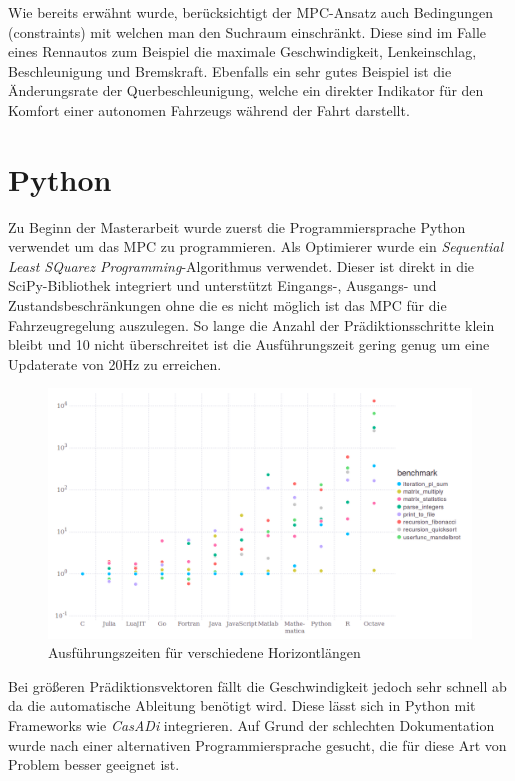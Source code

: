 \documentclass{like}
\begin{document}
Wie bereits erwähnt wurde, berücksichtigt der \ac{MPC}-Ansatz auch  Bedingungen (constraints) mit welchen man den Suchraum einschränkt. Diese sind im Falle eines Rennautos zum Beispiel die maximale Geschwindigkeit, Lenkeinschlag, Beschleunigung und Bremskraft. Ebenfalls ein sehr gutes Beispiel ist die Änderungsrate der Querbeschleunigung, welche ein direkter Indikator für den Komfort einer autonomen Fahrzeugs während der Fahrt darstellt.

\section{Python}

Zu Beginn der Masterarbeit wurde zuerst die Programmiersprache Python verwendet um das \ac{MPC} zu programmieren. Als Optimierer wurde ein \textit{Sequential Least SQuarez Programming}-Algorithmus verwendet. Dieser ist direkt in die SciPy-Bibliothek integriert und unterstützt Eingangs-, Ausgangs- und Zustandsbeschränkungen ohne die es nicht möglich ist das \ac{MPC} für die Fahrzeugregelung auszulegen. So lange die Anzahl der Prädiktionsschritte klein bleibt und 10 nicht überschreitet ist die Ausführungszeit gering genug um eine Updaterate von 20Hz zu erreichen. 

\begin{figure}[ht!]
	\includegraphics[width=400pt]{Abbildungen/juliaBenchmark.png}
	\caption{Ausführungszeiten für verschiedene Horizontlängen}
	\label{fig:juliaBench}
\end{figure}

Bei größeren Prädiktionsvektoren fällt die Geschwindigkeit jedoch sehr schnell ab da die automatische Ableitung benötigt wird. Diese lässt sich in Python mit Frameworks wie \textit{CasADi} \cite{Casadi:1} integrieren. Auf Grund der schlechten Dokumentation wurde nach einer alternativen Programmiersprache gesucht, die für diese Art von Problem besser geeignet ist.
\end{document}
